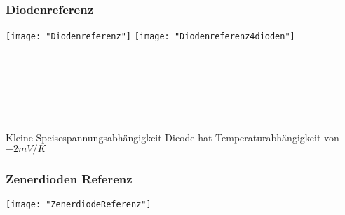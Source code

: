 \subsubsection{Diodenreferenz}
\begin{minipage}[t]{0.3\textwidth}
	\vspace{0pt}								%
	\texttt{[image: "Diodenreferenz"]}
	\texttt{[image: "Diodenreferenz4dioden"]}
\end{minipage}\hspace{0.05\textwidth}
\begin{minipage}[t]{0.3\textwidth}
	\vspace{0pt}
	\\
	\\
	\\
	\\
	\\
\end{minipage}
\begin{minipage}[t]{0.3\textwidth}
	\vspace{0pt}
	Kleine Speisespannungsabhängigkeit
	Dieode hat Temperaturabhängigkeit von $-2 mV/K$
	
\end{minipage}
\vspace{2mm}


\subsubsection{Zenerdioden Referenz}
\begin{minipage}[t]{0.3\textwidth}
	\vspace{0pt}								%
	\texttt{[image: "ZenerdiodeReferenz"]}
\end{minipage}\hspace{0.05\textwidth}
\begin{minipage}[t]{0.3\textwidth}
	\vspace{0pt}
\end{minipage}
\begin{minipage}[t]{0.3\textwidth}
	\vspace{0pt}
	
\end{minipage}
\vspace{2mm}


